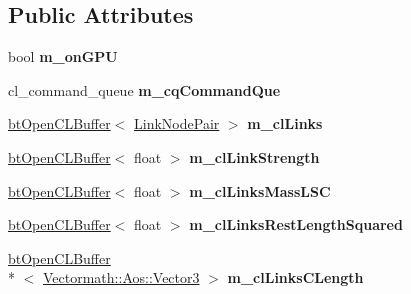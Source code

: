 \subsection*{Public Attributes}
\begin{DoxyCompactItemize}
\item 
\hypertarget{classbt_soft_body_link_data_open_c_l_aece77286bec72c11551481d76fb472fa}{bool {\bfseries m\+\_\+on\+G\+P\+U}}\label{classbt_soft_body_link_data_open_c_l_aece77286bec72c11551481d76fb472fa}

\item 
\hypertarget{classbt_soft_body_link_data_open_c_l_a6fef03532cdabfe84bbb948d7ab13a9f}{cl\+\_\+command\+\_\+queue {\bfseries m\+\_\+cq\+Command\+Que}}\label{classbt_soft_body_link_data_open_c_l_a6fef03532cdabfe84bbb948d7ab13a9f}

\item 
\hypertarget{classbt_soft_body_link_data_open_c_l_a86af8ed84ed55037caaa4b2a010ec536}{\hyperlink{classbt_open_c_l_buffer}{bt\+Open\+C\+L\+Buffer}$<$ \hyperlink{classbt_soft_body_link_data_1_1_link_node_pair}{Link\+Node\+Pair} $>$ {\bfseries m\+\_\+cl\+Links}}\label{classbt_soft_body_link_data_open_c_l_a86af8ed84ed55037caaa4b2a010ec536}

\item 
\hypertarget{classbt_soft_body_link_data_open_c_l_ae55b2132051e0fdf79a4c86b3c135fba}{\hyperlink{classbt_open_c_l_buffer}{bt\+Open\+C\+L\+Buffer}$<$ float $>$ {\bfseries m\+\_\+cl\+Link\+Strength}}\label{classbt_soft_body_link_data_open_c_l_ae55b2132051e0fdf79a4c86b3c135fba}

\item 
\hypertarget{classbt_soft_body_link_data_open_c_l_a0832cd63fb04d725a3065943ad4ffe42}{\hyperlink{classbt_open_c_l_buffer}{bt\+Open\+C\+L\+Buffer}$<$ float $>$ {\bfseries m\+\_\+cl\+Links\+Mass\+L\+S\+C}}\label{classbt_soft_body_link_data_open_c_l_a0832cd63fb04d725a3065943ad4ffe42}

\item 
\hypertarget{classbt_soft_body_link_data_open_c_l_a690d72dd3aef09ce14d1f1b031056e97}{\hyperlink{classbt_open_c_l_buffer}{bt\+Open\+C\+L\+Buffer}$<$ float $>$ {\bfseries m\+\_\+cl\+Links\+Rest\+Length\+Squared}}\label{classbt_soft_body_link_data_open_c_l_a690d72dd3aef09ce14d1f1b031056e97}

\item 
\hypertarget{classbt_soft_body_link_data_open_c_l_a7501ddeaacc6e79be0f90d1322276108}{\hyperlink{classbt_open_c_l_buffer}{bt\+Open\+C\+L\+Buffer}\\*
$<$ \hyperlink{class_vectormath_1_1_aos_1_1_vector3}{Vectormath\+::\+Aos\+::\+Vector3} $>$ {\bfseries m\+\_\+cl\+Links\+C\+Length}}\label{classbt_soft_body_link_data_open_c_l_a7501ddeaacc6e79be0f90d1322276108}


\end{DoxyCompactItemize}
